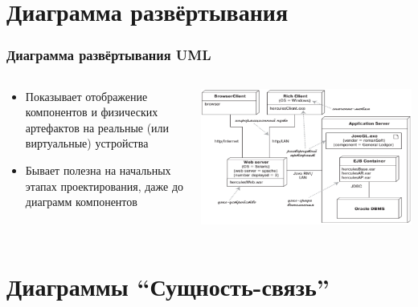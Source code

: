 \documentclass{../../slides-style}
\begin{document}
    \section{Диаграмма развёртывания}
    
    \begin{frame}
        \frametitle{Диаграмма развёртывания UML}
        \begin{columns}
            \begin{column}{0.5\textwidth}
                \begin{itemize}
                    \item Показывает отображение компонентов и физических артефактов на реальные (или виртуальные) устройства
                    \item Бывает полезна на начальных этапах проектирования, даже до диаграмм компонентов
                \end{itemize}
            \end{column}
            \begin{column}{0.5\textwidth}
                \begin{center}
                    \includegraphics[width=\textwidth]{deploymentDiagram.png}
                \end{center}
            \end{column}
        \end{columns}
    \end{frame}

    \section{Диаграммы ``Сущность-связь''}
\end{document}
